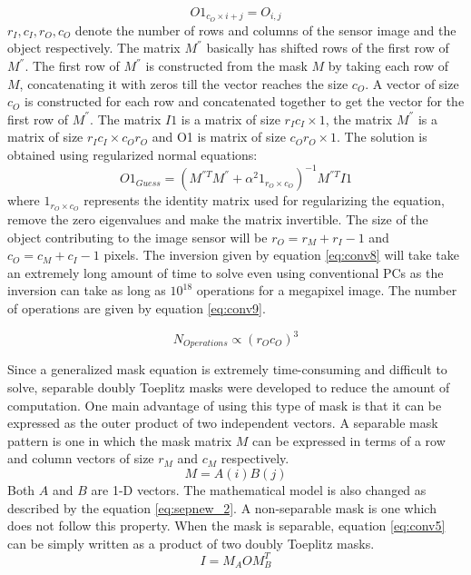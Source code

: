 \begin{equation}
O1_{c_O \times i + j} = O_{i,j}
\label{eq:conv7}
\end{equation}
$r_I, c_I, r_O, c_O$ denote the number of rows and columns of the sensor image and the object respectively. The matrix $ M^{''}$ basically has shifted rows of the first row of $ M^{''}$. The first row of $ M^{''}$ is constructed from the mask $M$ by taking each row of $M$, concatenating it with zeros till the vector reaches the size $c_O$. A vector of size $c_O$ is constructed for each row and concatenated together to get the vector for the first row of $ M^{''}$. The matrix $I1$ is a matrix of size $r_Ic_I \times 1$, the matrix  $M^{''}$ is a matrix of size $r_Ic_I \times c_Or_O$ and O1 is matrix of size $c_O r_O \times 1$. The solution is obtained using regularized normal equations:
\begin{equation}
O1_{Guess} = (M^{''T}M^{''} + \alpha^2 1_{r_O \times c_O})^{-1} M^{''T} I1
\label{eq:conv8}
\end{equation}
where $1_{r_O \times c_O}$ represents the identity matrix used for regularizing the equation, remove the zero eigenvalues and make the matrix invertible. The size of the object contributing to the image sensor will be $r_O = r_M + r_I - 1$ and $c_O = c_M + c_I - 1$ pixels. The inversion given by equation \ref{eq:conv8} will take take an extremely long amount of time to solve even using conventional PCs as the inversion can take as long as $10^{18}$ operations for a megapixel image. The number of operations are given by equation \ref{eq:conv9}\cite{Toeplitz}. 

\begin{equation}
N_{Operations} \propto (r_{O}c_{O})^3
\label{eq:conv9}
\end{equation}

Since a generalized mask equation is extremely time-consuming and difficult to solve, separable doubly Toeplitz masks were developed\cite{Toeplitz} to reduce the amount of computation. One main advantage of using this type of mask is that it can be expressed as the outer product of two independent vectors. A separable mask pattern is one in which the mask matrix $M$ can be expressed in terms of a row and column vectors of size $r_M$ and $c_M$ respectively. 
\begin{equation}
M = A(i) B(j)
\label{eq:sepnew_1}
\end{equation}
Both $A$ and $B$ are 1-D vectors. The mathematical model is also changed as described by the equation \ref{eq:sepnew_2}. A non-separable mask is one which does not follow this property. When the mask is separable, equation \ref{eq:conv5} can be simply written as a product of two doubly Toeplitz masks.
\begin{equation}
I = M_A O M_B ^ T
\label{eq:sepnew_2}
\end{equation}

